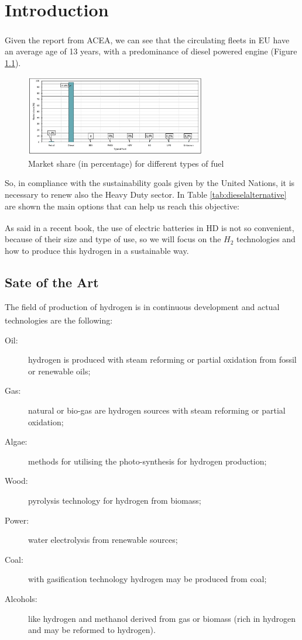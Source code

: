 \newpage
\chapter{Introduction}
Given the report from ACEA\textsuperscript{\cite{ACEA2021}}, we can see that the circulating fleets in EU have an average age of 13 years, with a predominance of diesel powered engine (Figure \ref{fig:hdpower}).
\begin{figure}[hb]
    \centering
    \includegraphics[width=0.7\textwidth]{Chapters/Pictures/Fuels_MarketShare.jpeg}
    \caption{Market share (in percentage) for different types of fuel}
    \label{fig:hdpower}
\end{figure}

So, in compliance with the sustainability goals given by the United Nations, it is necessary to renew also the Heavy Duty sector. In Table \ref{tab:dieselalternative} are shown the main options that can help us reach this objective:



As said in a recent book\textsuperscript{\cite{Mazzo2021}}, the use of electric batteries in HD is not so convenient, because of their size and type of use, so we will focus on the $H_2$ technologies and how to produce this hydrogen in a sustainable way.

\section{Sate of the Art}
The field of production of hydrogen is in continuous development and actual technologies are the following\textsuperscript{\cite{guanda20211}}:
\begin{description}
    \item[Oil:] hydrogen is produced with steam reforming or partial oxidation from fossil or renewable oils;
    \item[Gas:] natural or bio-gas are hydrogen sources with steam reforming or partial oxidation;
    \item[Algae:] methods for utilising the photo-synthesis for hydrogen production;
    \item[Wood:] pyrolysis technology for hydrogen from biomass;
    \item[Power:] water electrolysis from renewable sources;
    \item[Coal:] with gasification technology hydrogen may be produced from coal;
    \item[Alcohols:] like hydrogen and methanol derived from gas or biomass (rich in hydrogen and may be reformed to hydrogen).
\end{description}

